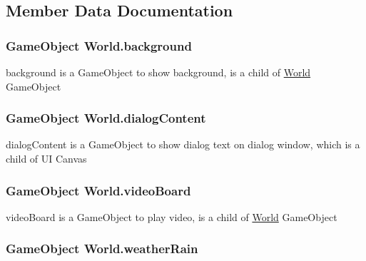 \subsection{Member Data Documentation}
\subsubsection[{\texorpdfstring{background}{background}}]{\setlength{\rightskip}{0pt plus 5cm}Game\+Object World.\+background}\hypertarget{class_world_a3612dc0a0f19a942ee02d2868b364904}{}\label{class_world_a3612dc0a0f19a942ee02d2868b364904}


background is a Game\+Object to show background, is a child of \hyperlink{class_world}{World} Game\+Object 

\subsubsection[{\texorpdfstring{dialog\+Content}{dialogContent}}]{\setlength{\rightskip}{0pt plus 5cm}Game\+Object World.\+dialog\+Content}\hypertarget{class_world_a9a36c5ca7478a1f3085abe105b0aaad7}{}\label{class_world_a9a36c5ca7478a1f3085abe105b0aaad7}


dialog\+Content is a Game\+Object to show dialog text on dialog window, which is a child of UI Canvas 

\subsubsection[{\texorpdfstring{video\+Board}{videoBoard}}]{\setlength{\rightskip}{0pt plus 5cm}Game\+Object World.\+video\+Board}\hypertarget{class_world_a3f5611886c86b79c1c3859bb22d9188c}{}\label{class_world_a3f5611886c86b79c1c3859bb22d9188c}


video\+Board is a Game\+Object to play video, is a child of \hyperlink{class_world}{World} Game\+Object 

\subsubsection[{\texorpdfstring{weather\+Rain}{weatherRain}}]{\setlength{\rightskip}{0pt plus 5cm}Game\+Object World.\+weather\+Rain}\hypertarget{class_world_a1b9a3cfed2eb973bb14d5c66d701ee9a}{}\label{class_world_a1b9a3cfed2eb973bb14d5c66d701ee9a}


